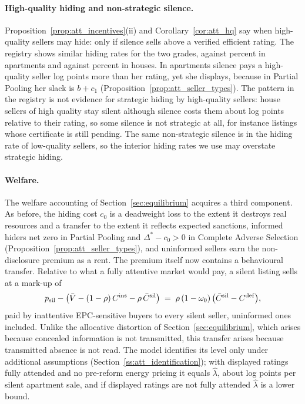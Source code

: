 \paragraph{High-quality hiding and non-strategic silence.}
Proposition~\ref{prop:att_incentives}(ii) and Corollary~\ref{cor:att_hq} say when high-quality sellers may hide: only if silence sells above a verified efficient rating. The registry shows similar hiding rates for the two grades, \attSigmaOneApt{} against \attSigmaZeroApt{} percent in apartments and \attSigmaOneHouse{} against \attSigmaZeroHouse{} percent in houses. In apartments silence pays a high-quality seller \attExcessApt{} log points more than her rating, yet she displays, because in Partial Pooling her slack is $b+c_1$ (Proposition~\ref{prop:att_seller_types}). The pattern in the registry is not evidence for strategic hiding by high-quality sellers: house sellers of high quality stay silent although silence costs them about \attHighLossHouse{} log points relative to their rating, so some silence is not strategic at all, for instance listings whose certificate is still pending. The same non-strategic silence is in the hiding rate of low-quality sellers, so the interior hiding rates we use may overstate strategic hiding.

\paragraph{Welfare.}
The welfare accounting of Section~\ref{sec:equilibrium} acquires a third component. As before, the hiding cost $c_0$ is a deadweight loss to the extent it destroys real resources and a transfer to the extent it reflects expected sanctions, informed hiders net zero in Partial Pooling and $\Delta^*-c_0>0$ in Complete Adverse Selection (Proposition~\ref{prop:att_seller_types}), and uninformed sellers earn the non-disclosure premium as a rent. The premium itself now contains a behavioural transfer. Relative to what a fully attentive market would pay, a silent listing sells at a mark-up of
\begin{equation}
    p_{\rm sil}-\big(\bar V-(1-\rho)\,C^{\rm ins}-\rho\,\bar C^{\rm sil}\big)\;=\;\rho\,(1-\omega_0)\,\big(\bar C^{\rm sil}-C^{\rm def}\big),
    \label{eq:att_markup}
\end{equation}
paid by inattentive EPC-sensitive buyers to every silent seller, uninformed ones included. Unlike the allocative distortion of Section~\ref{sec:equilibrium}, which arises because concealed information is not transmitted, this transfer arises because transmitted absence is not read. The model identifies its level only under additional assumptions (Section~\ref{ss:att_identification}); with displayed ratings fully attended and no pre-reform energy pricing it equals $\hat\lambda$, about \attLamApt{} log points per silent apartment sale, and if displayed ratings are not fully attended $\hat\lambda$ is a lower bound.

